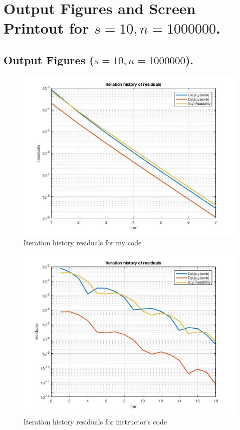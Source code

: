 \clearpage
\section{Output Figures and Screen Printout for $s=10,n=1000000$.}
\subsection{Output Figures ($s=10,n=1000000$).}
\begin{figure}[H]
\centering
\includegraphics[width=12cm]{F_13/F_1_2.jpg}
\caption{Iteration history residuals for my code}
\end{figure}
\begin{figure}[H]
\centering
\includegraphics[width=12cm]{F_13/F_1_3.jpg}
\caption{Iteration history residuals for instructor's code}
\end{figure}

